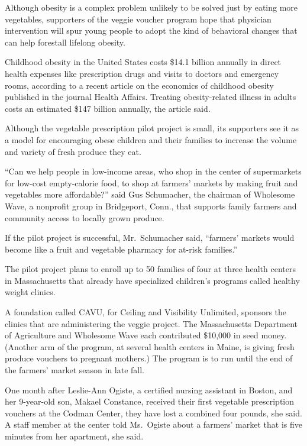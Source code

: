 ﻿\documentclass[12pt]{article}
\begin{document}
Although obesity is a complex problem unlikely to be solved just by eating more vegetables,
supporters of the veggie voucher program hope that physician intervention will spur young people to
adopt the kind of behavioral changes that can help forestall lifelong obesity.

Childhood obesity in the United States costs \$14.1 billion annually in direct health expenses like
prescription drugs and visits to doctors and emergency rooms, according to a recent article on the
economics of childhood obesity published in the journal Health Affairs. Treating obesity-related
illness in adults costs an estimated \$147 billion annually, the article said.

Although the vegetable prescription pilot project is small, its supporters see it as a model for
encouraging obese children and their families to increase the volume and variety of fresh produce
they eat.

``Can we help people in low-income areas, who shop in the center of supermarkets for low-cost
empty-calorie food, to shop at farmers' markets by making fruit and vegetables more affordable?''
said Gus Schumacher, the chairman of Wholesome Wave, a nonprofit group in Bridgeport, Conn., that
supports family farmers and community access to locally grown produce.

If the pilot project is successful, Mr.~Schumacher said, ``farmers' markets would become like a
fruit and vegetable pharmacy for at-risk families.''

The pilot project plans to enroll up to 50 families of four at three health centers in Massachusetts
that already have specialized children's programs called healthy weight clinics.

A foundation called CAVU, for Ceiling and Visibility Unlimited, sponsors the clinics that are
administering the veggie project. The Massachusetts Department of Agriculture and Wholesome Wave
each contributed \$10,000 in seed money. (Another arm of the program, at several health centers in
Maine, is giving fresh produce vouchers to pregnant mothers.) The program is to run until the end of
the farmers' market season in late fall.

One month after Leslie-Ann Ogiste, a certified nursing assistant in Boston, and her 9-year-old son,
Makael Constance, received their first vegetable prescription vouchers at the Codman Center, they
have lost a combined four pounds, she said. A staff member at the center told Ms.~Ogiste about a
farmers' market that is five minutes from her apartment, she said.
\end{document}
